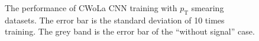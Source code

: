 \documentclass[12pt]{article}
\begin{document}
\begin{figure}[htpb]
{			}
			\caption{The performance of CWoLa CNN training with $p_{\text{T}}$ smearing datasets. The error bar is the standard deviation of 10 times training. The grey band is the error bar of the ``without signal'' case.}
			\label{fig:acc_auc_curve_origin_pt_aug_1_3_5_res_25_75}
		\end{figure}
\end{document}
